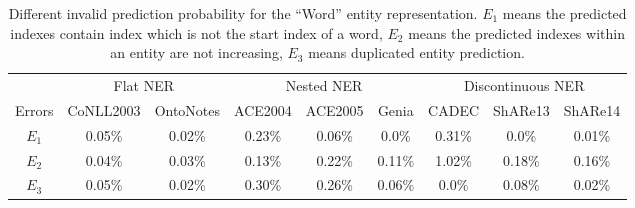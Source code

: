 \documentclass[11pt,a4paper]{article}
\begin{document}
\begin{table*}[!bht]
  \centering
  \setlength{\tabcolsep}{2pt}  \renewcommand{\arraystretch}{1.2}
  \begin{tabular}{c|c|c|c|c|c|c|c|c}
\toprule
         & \multicolumn{2}{c|}{Flat NER} & \multicolumn{3}{c|}{Nested NER} & \multicolumn{3}{c}{Discontinuous NER} \\
    \cline{2-9}
  Errors & CoNLL2003     & OntoNotes    & ACE2004   & ACE2005   & Genia  & CADEC     & ShARe13     & ShARe14     \\
\hline
  $E_1$     & 0.05\%        & 0.02\%       & 0.23\%    & 0.06\%   & 0.0\%   & 0.31\%     & 0.0\%       & 0.01\%     \\  \hline

  $E_2$     & 0.04\%        & 0.03\%       & 0.13\%    & 0.22\%   & 0.11\%  & 1.02\%     & 0.18\%      & 0.16\%     \\  \hline
  $E_3$     & 0.05\%        & 0.02\%       & 0.30\%    & 0.26\%   & 0.06\%  & 0.0\%      & 0.08\%      & 0.02\%   \\
\bottomrule
  \end{tabular}
  \caption{Different invalid prediction probability for the ``Word'' entity representation. $E_1$ means the predicted indexes contain index which is not the start index of a word, $E_2$ means the predicted indexes within an entity are not increasing, $E_3$ means duplicated entity prediction.  }
  \label{tb:invalid}
\end{table*}
\end{document}
